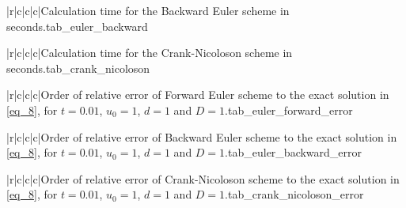 \documentclass[11pt,english,a4paper]{article}
\begin{document}
\begin{flushleft}
\begin{tabell}{|r|c|c|c|}{\small}{}{}{Calculation time for the Backward Euler scheme in seconds.}{tab_euler_backward}
\end{tabell}

\begin{tabell}{|r|c|c|c|}{\small}{}{}{Calculation time for the Crank-Nicoloson scheme in seconds.}{tab_crank_nicoloson}
\end{tabell}

\begin{tabell}{|r|c|c|c|}{\small}{}{}{Order of relative error of Forward Euler scheme to the exact solution in \eqref{eq_8}, for $t=0.01$, $u_0 = 1$, $d = 1$ and $D = 1$.}{tab_euler_forward_error}
\end{tabell}

\begin{tabell}{|r|c|c|c|}{\small}{}{}{Order of relative error of Backward Euler scheme to the exact solution in \eqref{eq_8}, for $t=0.01$, $u_0 = 1$, $d = 1$ and $D = 1$.}{tab_euler_backward_error}
\end{tabell}

\begin{tabell}{|r|c|c|c|}{\small}{}{}{Order of relative error of Crank-Nicoloson scheme to the exact solution in \eqref{eq_8}, for $t=0.01$, $u_0 = 1$, $d = 1$ and $D = 1$.}{tab_crank_nicoloson_error}
\end{tabell}




\end{flushleft}
\end{document}
